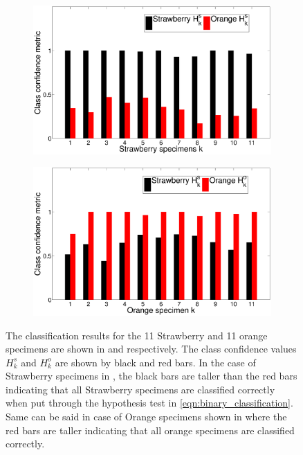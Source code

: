 \documentclass {udthesis}
\begin{document}
%
\begin{figure}
  \centering
  \begin{subfigure}[]{0.7\textwidth}
      \includegraphics[width=\textwidth]{classification_metric_strawberry}
      \caption{}
      \label{fig:results_strawberry}
  \end{subfigure}
  \vskip -2pt
  \begin{subfigure}[]{0.7\textwidth}
      \includegraphics[width=\textwidth]{classification_metric_orange}
      \caption{}
      \label{fig:results_orange}
  \end{subfigure}
\caption[Classification results]{The classification results for the 11 Strawberry and 11 orange specimens are shown in  and  respectively. The class confidence values $H^s_k$ and $H^o_k$ are shown by black and red bars. In the case of Strawberry specimens in , the black bars are taller than the red bars indicating that all Strawberry specimens are classified correctly when put through the hypothesis test in \ref{eqn:binary_classification}. Same can be said in case of Orange specimens shown in  where the red bars are taller indicating that all orange specimens are classified correctly.}
\label{fig:results}
\end{figure}	
%
\end{document}
